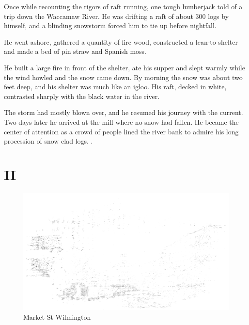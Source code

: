 \documentclass[11pt, a5paper, openright]{book}
\begin{document}
Once while recounting the rigors of raft running, one tough lumberjack
told of a trip down the Waccamaw River.  He was drifting a raft of
about 300 logs by himself, and a blinding snowstorm forced him to tie
up before nightfall.\par

He went ashore, gathered a quantity of fire wood, constructed a
lean-to shelter and made a bed of pin straw and Spanish moss.\par

He built a large fire in front of the shelter, ate his supper and
slept warmly while the wind howled and the snow came down.  By morning
the snow was about two feet deep, and his shelter was much like an
igloo.  His raft, decked in white, contrasted sharply with the black
water in the river.\par

The storm had mostly blown over, and he resumed his journey with the
current.  Two days later he arrived at the mill where no snow had
fallen.  He became the center of attention as a crowd of people lined
the river bank to admire his long procession of snow clad logs.
\citep{stevensjg}.\par

\makeatletter\@openrightfalse%

\part{II}

\begin{figure}[htb]
\centering
  \begin{turn}{90}
      \begin{minipage}{5.8in}
        \centering
        \includegraphics[scale=.18]{ballous_pictorial_24_feb_1855_pp_121}
        \caption{Market St Wilmington}
      \end{minipage}
    \end{turn}
\end{figure}
\end{document}
